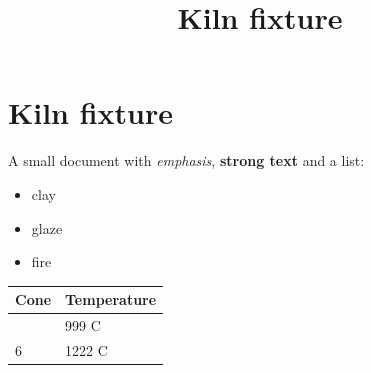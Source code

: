 \documentclass[
]{article}
\title{Kiln fixture}
\author{}
\date{}
\providecommand{\tightlist}{%
  \setlength{\itemsep}{0pt}\setlength{\parskip}{0pt}}
\begin{document}
\maketitle

\section{Kiln fixture}\label{kiln-fixture}

A small document with \emph{emphasis}, \textbf{strong text} and a list:

\begin{itemize}
\tightlist
\item
  clay
\item
  glaze
\item
  fire
\end{itemize}

\begin{longtable}[]{@{}ll@{}}
\toprule\noalign{}
Cone & Temperature \\
\midrule\noalign{}
\endhead
\bottomrule\noalign{}
\endlastfoot
06 & 999 C \\
6 & 1222 C \\
\end{longtable}
\end{document}
